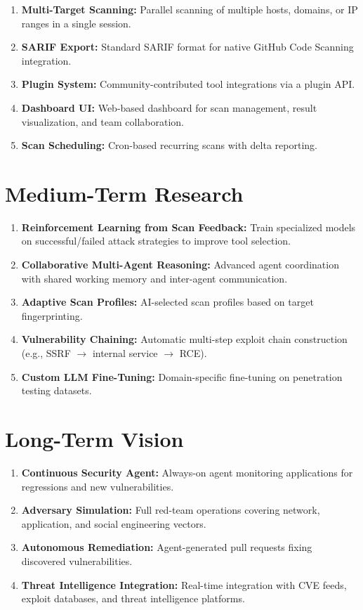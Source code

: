 \documentclass[12pt,a4paper,twoside]{report}
\begin{document}
\begin{enumerate}
    \item \textbf{Multi-Target Scanning:} Parallel scanning of multiple hosts, domains, or IP ranges in a single session.
    \item \textbf{SARIF Export:} Standard SARIF format for native GitHub Code Scanning integration.
    \item \textbf{Plugin System:} Community-contributed tool integrations via a plugin API.
    \item \textbf{Dashboard UI:} Web-based dashboard for scan management, result visualization, and team collaboration.
    \item \textbf{Scan Scheduling:} Cron-based recurring scans with delta reporting.
\end{enumerate}

\section{Medium-Term Research}

\begin{enumerate}
    \item \textbf{Reinforcement Learning from Scan Feedback:} Train specialized models on successful/failed attack strategies to improve tool selection.
    \item \textbf{Collaborative Multi-Agent Reasoning:} Advanced agent coordination with shared working memory and inter-agent communication.
    \item \textbf{Adaptive Scan Profiles:} AI-selected scan profiles based on target fingerprinting.
    \item \textbf{Vulnerability Chaining:} Automatic multi-step exploit chain construction (e.g., SSRF $\rightarrow$ internal service $\rightarrow$ RCE).
    \item \textbf{Custom LLM Fine-Tuning:} Domain-specific fine-tuning on penetration testing datasets.
\end{enumerate}

\section{Long-Term Vision}

\begin{enumerate}
    \item \textbf{Continuous Security Agent:} Always-on agent monitoring applications for regressions and new vulnerabilities.
    \item \textbf{Adversary Simulation:} Full red-team operations covering network, application, and social engineering vectors.
    \item \textbf{Autonomous Remediation:} Agent-generated pull requests fixing discovered vulnerabilities.
    \item \textbf{Threat Intelligence Integration:} Real-time integration with CVE feeds, exploit databases, and threat intelligence platforms.
\end{enumerate}
\end{document}
